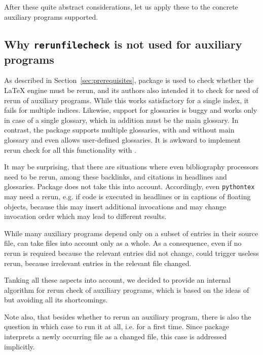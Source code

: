 After these quite abstract considerations, 
let us apply these to the concrete auxiliary programs supported. 





\subsection{Why \texttt{rerunfilecheck} is not used for auxiliary programs}%
\label{subsec:noRerunfilecheck}

As described in Section~\ref{sec:prerequisites}, 
package  is used to check 
whether the \LaTeX{} engine must be rerun, 
and its authors also intended it to check 
for need of rerun of auxiliary programs. 
While this works satisfactory for a single index, 
it fails for multiple indices. 
Likewise, support for glossaries is buggy and works only in case of a single glossary, 
which in addition must be the main glossary. 
In contrast, the package  supports multiple glossaries, 
with and without main glossary 
and even allows user-defined glossaries. 
It is awkward to implement rerun check 
for all this functionality with . 

It may be surprising, that there are situations 
where even bibliography processors need to be rerun, 
among these backlinks, and citations in headlines and glossaries. 
Package  does not take this into account. 
Accordingly, even \texttt{pythontex} may need a rerun, 
e.g. if code is executed in headlines or in captions of floating objects, 
because this may insert additional invocations and may change invocation order 
which may lead to different results. 

While many auxiliary programs depend only on a subset of entries 
in their source file, 
 can take files into account only as a whole. 
As a consequence, even if no rerun is required 
because the relevant entries did not change, 
 could trigger useless rerun, 
because irrelevant entries in the relevant file changed. 

Tanking all these aspects into account, 
we decided to provide an internal algorithm for rerun check of auxiliary programs, 
which is based on the ideas of  
but avoiding all its shortcomings. 

Note also, that besides whether to rerun an auxiliary program, 
there is also the question in which case to run it at all, i.e. for a first time. 
Since package  interprets a newly occurring file 
as a changed file, this case is addressed implicitly. 

